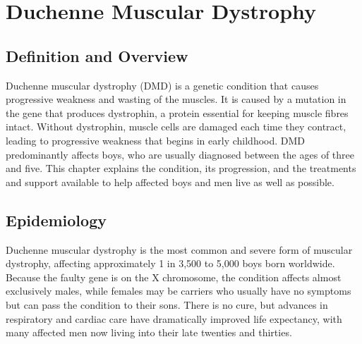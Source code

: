 \chapter{Duchenne Muscular Dystrophy}

\section*{Definition and Overview}
Duchenne muscular dystrophy (DMD) is a genetic condition that causes progressive weakness and wasting of the muscles. It is caused by a mutation in the gene that produces dystrophin, a protein essential for keeping muscle fibres intact. Without dystrophin, muscle cells are damaged each time they contract, leading to progressive weakness that begins in early childhood. DMD predominantly affects boys, who are usually diagnosed between the ages of three and five. This chapter explains the condition, its progression, and the treatments and support available to help affected boys and men live as well as possible.

\section*{Epidemiology}
Duchenne muscular dystrophy is the most common and severe form of muscular dystrophy, affecting approximately 1 in 3,500 to 5,000 boys born worldwide. Because the faulty gene is on the X chromosome, the condition affects almost exclusively males, while females may be carriers who usually have no symptoms but can pass the condition to their sons. There is no cure, but advances in respiratory and cardiac care have dramatically improved life expectancy, with many affected men now living into their late twenties and thirties.

